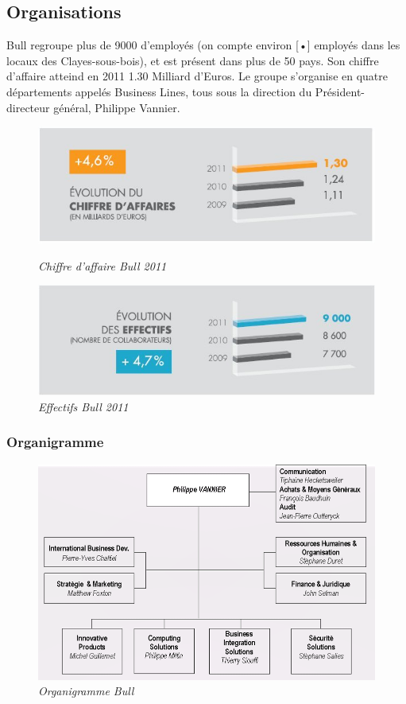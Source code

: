 \documentclass[11pt]{article}
\begin{document}
		\subsection{Organisations}
		Bull regroupe plus de 9000 d’employés (on compte environ [•] employés dans les locaux des Clayes-sous-bois), et est 
		présent dans plus de 50 pays. Son chiffre d'affaire atteind en 2011 1.30 Milliard d'Euros. Le groupe s'organise en 
		quatre départements appelés Business Lines, tous sous la direction du Président-directeur général, Philippe Vannier.
		\begin{figure}[h!]
		\begin{minipage}[b]{0.5\linewidth}
		\centering \includegraphics[scale=0.5]{profil2012_ca_fr.jpg}
		\caption{\it Chiffre d'affaire Bull 2011}
		\end{minipage}\hfill
		\begin{minipage}[b]{0.5\linewidth}
		\centering \includegraphics[scale=0.5]{profil2012_effectifs_fr.jpg}
		\caption{\it Effectifs Bull 2011}
		\end{minipage}
		\end{figure}
		\subsubsection{Organigramme}
		\begin{figure}[h!]
		\centering \includegraphics[scale=0.4]{organigramme.png}
		\caption{\it Organigramme Bull}
		\end{figure}
\end{document}
